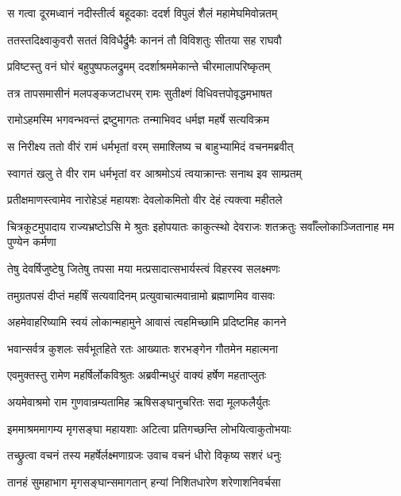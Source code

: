 \twolineshloka
{स गत्वा दूरमध्वानं नदीस्तीर्त्व बहूदकाः}
{ददर्श विपुलं शैलं महामेघमिवोन्नतम्} %

\twolineshloka
{ततस्तदिक्ष्वाकुवरौ सततं विविधैर्द्रुमैः}
{काननं तौ विविशतुः सीतया सह राघवौ} %

\twolineshloka
{प्रविष्टस्तु वनं घोरं बहुपुष्पफलद्रुमम्}
{ददर्शाश्रममेकान्ते चीरमालापरिष्कृतम्} %

\twolineshloka
{तत्र तापसमासीनं मलपङ्कजटाधरम्}
{रामः सुतीक्ष्णं विधिवत्तपोवृद्धमभाषत} %

\twolineshloka
{रामोऽहमस्मि भगवन्भवन्तं द्रष्टुमागतः}
{तन्माभिवद धर्मज्ञ महर्षे सत्यविक्रम} %

\twolineshloka
{स निरीक्ष्य ततो वीरं रामं धर्मभृतां वरम्}
{समाश्लिष्य च बाहुभ्यामिदं वचनमब्रवीत्} %

\twolineshloka
{स्वागतं खलु ते वीर राम धर्मभृतां वर}
{आश्रमोऽयं त्वयाक्रान्तः सनाथ इव साम्प्रतम्} %

\twolineshloka
{प्रतीक्षमाणस्त्वामेव नारोहेऽहं महायशः}
{देवलोकमितो वीर देहं त्यक्त्वा महीतले} %

\threelineshloka
{चित्रकूटमुपादाय राज्यभ्रष्टोऽसि मे श्रुतः}
{इहोपयातः काकुत्स्थो देवराजः शतक्रतुः}
{सर्वाँल्लोकाञ्जितानाह मम पुण्येन कर्मणा} %

\twolineshloka
{तेषु देवर्षिजुष्टेषु जितेषु तपसा मया}
{मत्प्रसादात्सभार्यस्त्वं विहरस्व सलक्ष्मणः} %

\twolineshloka
{तमुग्रतपसं दीप्तं महर्षिं सत्यवादिनम्}
{प्रत्युवाचात्मवान्रामो ब्रह्माणमिव वासवः} %

\twolineshloka
{अहमेवाहरिष्यामि स्वयं लोकान्महामुने}
{आवासं त्वहमिच्छामि प्रदिष्टमिह कानने} %

\twolineshloka
{भवान्सर्वत्र कुशलः सर्वभूतहिते रतः}
{आख्यातः शरभङ्गेन गौतमेन महात्मना} %

\twolineshloka
{एवमुक्तस्तु रामेण महर्षिर्लोकविश्रुतः}
{अब्रवीन्मधुरं वाक्यं हर्षेण महताप्लुतः} %

\twolineshloka
{अयमेवाश्रमो राम गुणवान्रम्यतामिह}
{ऋषिसङ्घानुचरितः सदा मूलफलैर्युतः} %

\twolineshloka
{इममाश्रममागम्य मृगसङ्घा महायशाः}
{अटित्वा प्रतिगच्छन्ति लोभयित्वाकुतोभयाः} %

\twolineshloka
{तच्छ्रुत्वा वचनं तस्य महर्षेर्लक्ष्मणाग्रजः}
{उवाच वचनं धीरो विकृष्य सशरं धनुः} %

\twolineshloka
{तानहं सुमहाभाग मृगसङ्घान्समागतान्}
{हन्यां निशितधारेण शरेणाशनिवर्चसा} %

